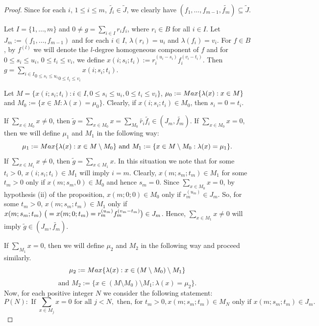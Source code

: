 \documentclass[10pt,a4paper]{amsart}
\begin{document}
\begin{proof}
Since for each $i$, $1\leqslant i\leqslant m$, $\widetilde{f_i}\in\widetilde{J}$, we clearly have $(f_1,\dots,f_{m-1}, \widetilde{f_m})\subseteq \widetilde{J}$.

\medskip\noindent
Let $I=\{1,\dots,m\}$ and $0\neq g={\underset{i\in I}\sum}r_if_i$, where $r_i\in B$ for all $i\in I$. Let $J_m:=(f_1,\dots,f_{m-1})$ and for each $i\in I$, $\lambda(r_i)=u_i$ and $\lambda(f_i)=v_i$. For $f\in B$, by $f^{(l)}$ we will denote the $l$-degree homogeneous component of $f$ and for $0\leqslant s_i\leqslant u_i$, $0\leqslant t_i\leqslant v_i$, we define $x(i;s_i;t_i):=r_i^{(u_i-s_i)}f_i^{(v_i-t_i)}$. Then $g={\underset{0\leqslant t_i\leqslant v_i}{\underset{0\leqslant s_i\leqslant u_i}{\underset{i\in I}\sum}}}x(i;s_i;t_i).$

\smallskip\noindent Let $M=\{x(i;s_i;t_i):i\in I,0\leqslant s_i\leqslant u_i,0\leqslant t_i\leqslant v_i\}$, $\mu_0:={\rm Max}\{\lambda(x):x\in M \}$ and $M_0:=\{x\in M:\lambda(x)=\mu_0\}$. Clearly, if $x(i;s_i;t_i)\in M_0$, then $s_i=0=t_i$. 

\smallskip\noindent If ${\underset{x\in{M_0}}\sum}x\neq 0$, then $\widetilde {g}={\underset{x\in{M_0}}\sum}x={\underset{M_0}\sum}\widetilde{r_i}\widetilde{f_i}\in (J_m,\widetilde{f_m}).$ If ${\underset{x\in{M_0}}\sum}x=0$, then we will define $\mu_1$ and $M_1$ in the following way:
$$\mu_1:={\rm Max}\{\lambda(x):x\in M\setminus M_0 \} \text{ and }M_1:=\{x\in M\setminus M_0:\lambda(x)=\mu_1\}.$$ %
If ${\underset{x\in{M_1}}\sum}x\neq 0$, then $\widetilde {g}={\underset{x\in{M_1}}\sum}x$. In this situation we note that  for some $t_i>0$, $x(i;s_i;t_i)\in M_1$ will imply $i=m$. Clearly, $x(m;s_m;t_m)\in M_1$ for some $t_m>0$ only if $x(m;s_m,0)\in M_0$ and hence $s_m=0$. Since ${\underset{x\in{M_0}}\sum}x= 0$, by hypothesis (ii) of the proposition, $x(m;0;0)\in M_0$ only if $r_m^{(u_m)}\in J_m$. So, for some $t_m>0$, $x(m;s_m;t_m)\in M_1$ only if $x(m;s_m;t_m)~\big{(}=x(m;0;t_m)=r_m^{(u_m)}f_m^{(v_m-t_m)}\big{)}\in J_m$. Hence, ${\underset{x\in{M_1}}\sum}x\neq 0$ will imply $\widetilde{g}\in (J_m,\widetilde{f_m})$.

\medskip\noindent
If ${\underset{M_1}\sum}x=0$, then we will define $\mu_2$ and $M_2$ in the following way and proceed similarly.
$$\mu_2:={\rm Max}\{\lambda(x):x\in (M\setminus M_0)\setminus M_1 \}$$ $$\text{and }M_2:=\{x\in (M\setminus M_0)\setminus M_1:\lambda(x)=\mu_2\}.$$ 
Now, for each positive integer $N$ we consider the following statement:
$$P(N):\text{ If }{\underset{x\in M_j}\sum}x=0 \text{ for all } j<N, \text{ then, for }t_m>0, x(m;s_m;t_m)\in M_N\text{ only if }x(m;s_m;t_m)\in J_m.$$


\end{proof}
\end{document}

